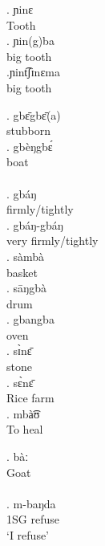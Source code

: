 \documentclass{assets/fieldnotes}
\begin{document}
\exg. ɲinɛ\\
Tooth\\

\exg. ɲin(g)ba\\
big tooth\\

\exg.ɲint͡ʃɪnɛma\\
big tooth\\


\exg. gbɛ̄gbɛ̄(a)\\
stubborn\\

\exg. gbèŋgbɛ́\\
boat\\
\\

\exg. gbáŋ\\
firmly/tightly\\

\exg. gbáŋ-gbáŋ\\
very firmly/tightly\\


\exg. sàmbà\\
basket\\

\exg. sāŋgbà\\
drum\\

\exg. gbangba\\
oven\\

\exg. sɪ̀nɛ̄\\
stone\\

\exg. sɛ̀nɛ̄\\
Rice farm\\

\exg. mbà͡ʊ\\
To heal\\

\exg. bàː\\
Goat\\

\\

\exg. m-baŋda\\
1SG refuse\\
`I refuse'
\end{document}
